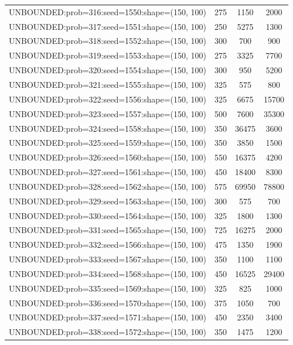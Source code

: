 \begin{longtable}{lccc}
UNBOUNDED:prob=316:seed=1550:shape=(150, 100) &      275 &  1150 &   2000 \\
UNBOUNDED:prob=317:seed=1551:shape=(150, 100) &      250 &  5275 &   1300 \\
UNBOUNDED:prob=318:seed=1552:shape=(150, 100) &      300 &   700 &    900 \\
UNBOUNDED:prob=319:seed=1553:shape=(150, 100) &      275 &  3325 &   7700 \\
UNBOUNDED:prob=320:seed=1554:shape=(150, 100) &      300 &   950 &   5200 \\
UNBOUNDED:prob=321:seed=1555:shape=(150, 100) &      325 &   575 &    800 \\
UNBOUNDED:prob=322:seed=1556:shape=(150, 100) &      325 &  6675 &  15700 \\
UNBOUNDED:prob=323:seed=1557:shape=(150, 100) &      500 &  7600 &  35300 \\
UNBOUNDED:prob=324:seed=1558:shape=(150, 100) &      350 & 36475 &   3600 \\
UNBOUNDED:prob=325:seed=1559:shape=(150, 100) &      350 &  3850 &   1500 \\
UNBOUNDED:prob=326:seed=1560:shape=(150, 100) &      550 & 16375 &   4200 \\
UNBOUNDED:prob=327:seed=1561:shape=(150, 100) &      450 & 18400 &   8300 \\
UNBOUNDED:prob=328:seed=1562:shape=(150, 100) &      575 & 69950 &  78800 \\
UNBOUNDED:prob=329:seed=1563:shape=(150, 100) &      300 &   575 &    700 \\
UNBOUNDED:prob=330:seed=1564:shape=(150, 100) &      325 &  1800 &   1300 \\
UNBOUNDED:prob=331:seed=1565:shape=(150, 100) &      725 & 16275 &   2000 \\
UNBOUNDED:prob=332:seed=1566:shape=(150, 100) &      475 &  1350 &   1900 \\
UNBOUNDED:prob=333:seed=1567:shape=(150, 100) &      350 &  1100 &   1100 \\
UNBOUNDED:prob=334:seed=1568:shape=(150, 100) &      450 & 16525 &  29400 \\
UNBOUNDED:prob=335:seed=1569:shape=(150, 100) &      325 &   825 &   1000 \\
UNBOUNDED:prob=336:seed=1570:shape=(150, 100) &      375 &  1050 &    700 \\
UNBOUNDED:prob=337:seed=1571:shape=(150, 100) &      450 &  2350 &   3400 \\
UNBOUNDED:prob=338:seed=1572:shape=(150, 100) &      350 &  1475 &   1200 \\

\end{longtable}
